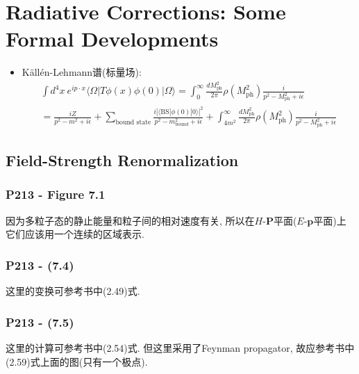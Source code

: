 \chapter{Radiative Corrections: Some Formal Developments}

\begin{itemize}
  \item Källén-Lehmann谱(标量场):
        \begin{gather*}
          \int d^4x\ e^{ip\cdot x}\langle \Omega |T\phi(x)\phi(0)|\Omega \rangle = \int_0^\infty \frac{dM_\text{ph}^2}{2\pi}\rho(M_\text{ph}^2)\frac{i}{p^2-M_\text{ph}^2+i\epsilon} \\
          = \frac{iZ}{p^2-m^2+i\epsilon} + \sum_\text{bound\ state}\frac{i|\langle \text{BS}|\phi(0)|0\rangle|^2}{p^2-m_\text{bound}^2+i\epsilon} + \int_{4m^2}^\infty \frac{dM_\text{ph}^2}{2\pi}\rho(M_\text{ph}^2)\frac{i}{p^2-M_\text{ph}^2+i\epsilon}
        \end{gather*}


\end{itemize}
\pagestyle{general}

\section{Field-Strength Renormalization}

\subsection{P213 - Figure 7.1}

因为多粒子态的静止能量和粒子间的相对速度有关, 所以在$H$-$\mathbf{P}$平面($E$-$\mathbf{p}$平面)上它们应该用一个连续的区域表示.

\subsection{P213 - (7.4)}

这里的变换可参考书中(2.49)式.

\subsection{P213 - (7.5)}

这里的计算可参考书中(2.54)式.
但这里采用了Feynman propagator, 故应参考书中(2.59)式上面的图(只有一个极点).

